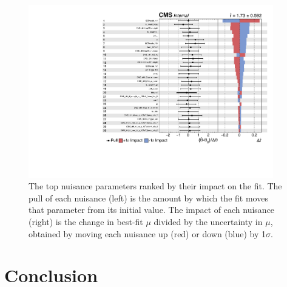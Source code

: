 \begin{figure}[htb]
        \centering 
        \includegraphics[width=0.95\textwidth]{ch11_figs/impacts_ttH_13TeV_top30.pdf}
        \caption[Nuisance parameter impacts]{The top nuisance parameters ranked by their impact on the fit. The pull of each nuisance (left) is the amount by which the fit moves that parameter from its
        initial value. The impact of each nuisance (right) is the change in best-fit $\mu$ divided by the uncertainty in $\mu$, obtained by moving each nuisance up (red) or down (blue) by 1$\sigma$.}
        \label{fig:impacts}
\end{figure}



\section{Conclusion}

